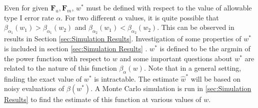 \documentclass[11pt]{article} %
\begin{document}
Even for  given $\mathbf{F}_u,\mathbf{F}_m$,   $w^*$ must be defined with respect to the value of allowable type I error rate $\alpha$.  For two different $\alpha$ values, it is quite possible that $\beta_{\alpha_1}(w_1)>\beta_{\alpha_1}(w_2)$  and $\beta_{\alpha_2}(w_1)<\beta_{\alpha_2}(w_2)$. This can be observed in results in Section \ref{sec:Simulation Results}.  
Investigation of some  properties of $w^{*}$  is included in section  \ref{sec:Simulation Results} .
 $w^*$ is defined to be the argmin of  the power function with respect to $w$ and some important questions about $w^*$ are  related to the nature of this function $\beta_{\alpha}\left( w\right)$.
Note that in a general setting, finding the exact value of $w^*$ is intractable. The estimate $\hat{w}^*$ will be based on noisy evaluations of $\beta(w^*)$.  A Monte Carlo simulation is run in   \ref{sec:Simulation Results} 
to find the estimate of this function at various values of $w$.
\end{document}
